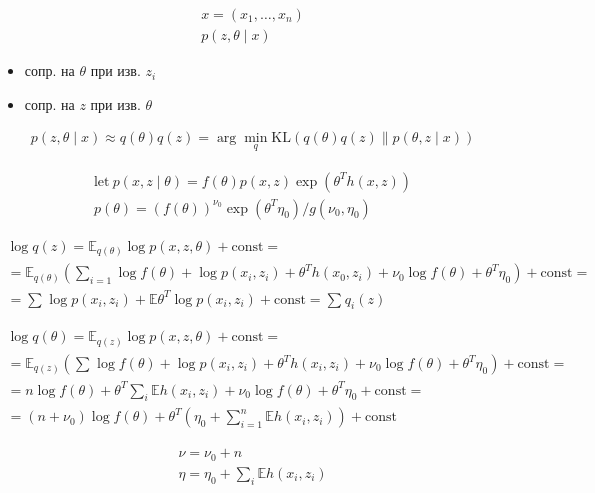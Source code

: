 \documentclass{book}
\begin{document}
\begin{gather*}
    x=(x_1,\dots,x_n)\\
    p(z,\theta\mid x)
\end{gather*}

\begin{itemize}
    \item сопр. на $\theta$ при изв. $z_i$ \\
    \item сопр. на $z$ при изв. $\theta$ \\
\end{itemize}

\begin{gather*}
    p(z,\theta\mid x)\approx q(\theta)q(z)=\arg\min_q \mathrm{KL}(q(\theta)q(z)\|p(\theta,z\mid x))
\end{gather*}

\begin{gather*}
    \mathrm{let}~p(x,z\mid \theta)=f(\theta)p(x,z)\exp(\theta^Th(x,z))\\
    p(\theta)=(f(\theta))^{\nu_0}\exp(\theta^T \eta_0)/g(\nu_0,\eta_0)
\end{gather*}

\begin{gather*}
    \log q(z)=\mathbb{E}_{q(\theta)}\log p(x,z,\theta)+\mathrm{const}=\\
    =\mathbb{E}_{q(\theta)}\left(\sum_{i=1}^{} {\log f(\theta)+\log p(x_i,z_i)+\theta^Th(x_0,z_i)+\nu_0\log f(\theta)+\theta^T\eta_0}\right)+\mathrm{const}=\\
    =\sum_{}^{} {\log p(x_i,z_i)+\mathbb{E}\theta^T\log p(x_i,z_i)}+\mathrm{const}=\sum_{}^{} {q_i(z)}
\end{gather*}

\begin{gather*}
    \log q(\theta)=\mathbb{E}_{q(z)}\log p(x,z,\theta)+\mathrm{const}=\\
    =\mathbb{E}_{q(z)}\left(\sum_{}^{} {\log f(\theta)+\log p(x_i,z_i)+\theta^Th(x_i,z_i)+\nu_0\log f(\theta)+\theta^T\eta_0}\right)+\mathrm{const}=\\
    =n\log f(\theta)+\theta^T \sum_{i}^{} {\mathbb{E}h(x_i,z_i)}+\nu_0\log f(\theta)+\theta^T\eta_0+\mathrm{const}=\\
    =(n+\nu_0)\log f(\theta)+\theta^T\left(\eta_0+\sum_{i=1}^{n} {\mathbb{E}h(x_i,z_i)}\right)+\mathrm{const}
\end{gather*}

\begin{gather*}
  \nu=\nu_0+n\\
  \eta=\eta_0+\sum_{i}^{} {\mathbb{E}h(x_i,z_i)}
\end{gather*}
\end{document}
